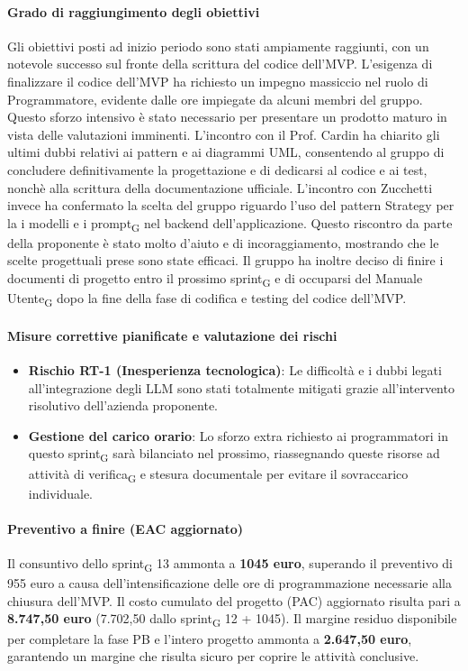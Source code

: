 \documentclass[11pt,a4paper]{article}
\newcommand{\gls}[1]{#1\textsubscript{G}}
\begin{document}
\paragraph{Grado di raggiungimento degli obiettivi}
Gli obiettivi posti ad inizio periodo sono stati ampiamente raggiunti, con un notevole successo sul fronte della scrittura del codice dell'MVP. L'esigenza di finalizzare il codice dell'MVP ha richiesto un impegno massiccio nel ruolo di Programmatore, evidente dalle ore impiegate da alcuni membri del gruppo. Questo sforzo intensivo è stato necessario per presentare un prodotto maturo in vista delle valutazioni imminenti.
L'incontro con il Prof. Cardin ha chiarito gli ultimi dubbi relativi ai pattern e ai diagrammi UML, consentendo al gruppo di concludere definitivamente la progettazione e di dedicarsi al codice e ai test, nonchè alla scrittura della documentazione ufficiale.
L'incontro con Zucchetti invece ha confermato la scelta del gruppo riguardo l'uso del pattern Strategy per la i modelli e i \gls{prompt} nel backend dell'applicazione. Questo riscontro da parte della proponente è stato molto d'aiuto e di incoraggiamento, mostrando che le scelte progettuali prese sono state efficaci.
Il gruppo ha inoltre deciso di finire i documenti di progetto entro il prossimo \gls{sprint} e di occuparsi del \gls{Manuale Utente} dopo la fine della fase di codifica e testing del codice dell'MVP.


\paragraph{Misure correttive pianificate e valutazione dei rischi}
\begin{itemize}
    \item \textbf{Rischio RT-1 (Inesperienza tecnologica)}: Le difficoltà e i dubbi legati all'integrazione degli LLM sono stati totalmente mitigati grazie all'intervento risolutivo dell'azienda proponente.
    \item \textbf{Gestione del carico orario}: Lo sforzo extra richiesto ai programmatori in questo \gls{sprint} sarà bilanciato nel prossimo, riassegnando queste risorse ad attività di \gls{verifica} e stesura documentale per evitare il sovraccarico individuale.
\end{itemize}

\paragraph{Preventivo a finire (EAC aggiornato)}
Il consuntivo dello \gls{sprint} 13 ammonta a \textbf{1045 euro}, superando il preventivo di 955 euro a causa dell'intensificazione delle ore di programmazione necessarie alla chiusura dell'MVP.
Il costo cumulato del progetto (PAC) aggiornato risulta pari a \textbf{8.747,50 euro} (7.702,50 dallo \gls{sprint} 12 + 1045). 
Il margine residuo disponibile per completare la fase PB e l'intero progetto ammonta a \textbf{2.647,50 euro}, garantendo un margine che risulta sicuro per coprire le attività conclusive.
\end{document}
